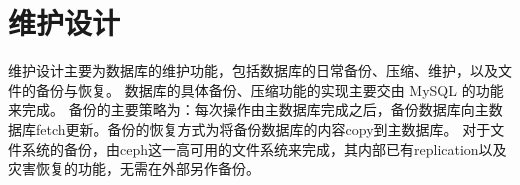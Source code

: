 \chapter{维护设计}
    维护设计主要为数据库的维护功能，包括数据库的日常备份、压缩、维护，以及文件的备份与恢复。
    数据库的具体备份、压缩功能的实现主要交由 MySQL 的功能来完成。
    备份的主要策略为：每次操作由主数据库完成之后，备份数据库向主数据库fetch更新。备份的恢复方式为将备份数据库的内容copy到主数据库。
    对于文件系统的备份，由ceph这一高可用的文件系统来完成，其内部已有replication以及灾害恢复的功能，无需在外部另作备份。